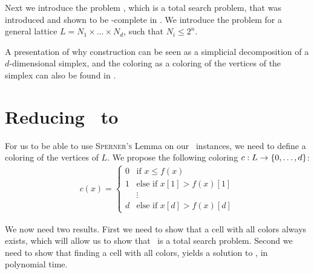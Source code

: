 Next we introduce the problem \Sperner, which is a total search problem, that was introduced and shown to be \PPAD-complete in . We introduce the problem for a general lattice $L = N_1 \times \dots \times N_d$, such that $N_i \leq 2^n$.


A presentation of why construction can be seen as a simplicial decomposition of a $d$-dimensional simplex, and the coloring as a coloring of the vertices of the simplex can also be found in \cite{papadimitriou_complexity_1994-1}.

\section{Reducing \Tarskistar\ to \Sperner}

For us to be able to use \textsc{Sperner's} Lemma on our \Tarskistar\ instances, we need to define a coloring of the vertices of $L$. We propose the following coloring $c : L \rightarrow \left\{0, \dots, d\right\}$:
\begin{align*}
    c(x) =
    \begin{cases}
        0 & \text{if $x \leq f(x)$}         \\
        1 & \text{else if $x[1] > f(x)[1]$} \\
          & \vdots                          \\
        d & \text{else if $x[d] > f(x)[d]$}
    \end{cases}
\end{align*}

We now need two results. First we need to show that a cell with all colors always exists, which will allow us to show that \Tarskistar\ is a total search problem. Second we need to show that finding a cell with all colors, yields a solution to \Tarskistar, in polynomial time.

